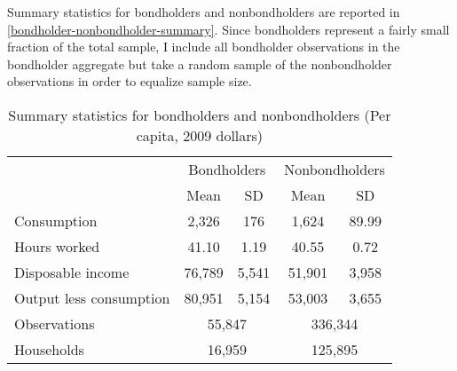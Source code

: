 Summary statistics for bondholders and nonbondholders are reported in \autoref{bondholder-nonbondholder-summary}. Since bondholders represent a fairly small fraction of the total sample, I include all bondholder observations in the bondholder aggregate but take a random sample of the nonbondholder observations in order to equalize sample size.

\begin{table}[b]
\centering
\caption{Summary statistics for bondholders and nonbondholders (Per capita, 2009 dollars)}
\label{bondholder-nonbondholder-summary}
\begin{tabular}{lcccc} \hline
& \multicolumn{2}{c}{Bondholders} & \multicolumn{2}{c}{Nonbondholders} \\
& Mean & SD & Mean & SD \\ \hline
Consumption             & 2,326  & 176   & 1,624  & 89.99 \\
Hours worked            & 41.10  & 1.19  & 40.55  & 0.72 \\
Disposable income       & 76,789 & 5,541 & 51,901 & 3,958 \\
Output less consumption & 80,951 & 5,154 & 53,003 & 3,655 \\ \hline
Observations            & \multicolumn{2}{c}{55,847} & \multicolumn{2}{c}{336,344} \\
Households              & \multicolumn{2}{c}{16,959} & \multicolumn{2}{c}{125,895} \\ \hline
\end{tabular}
\end{table}